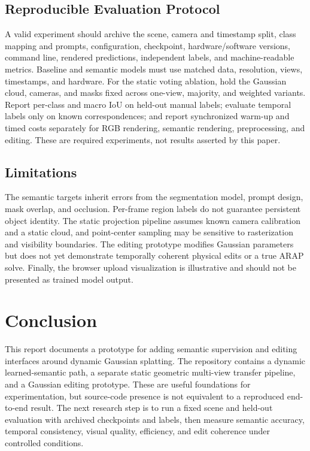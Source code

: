\documentclass[conference]{IEEEtran}
\begin{document}
\subsection{Reproducible Evaluation Protocol}
A valid experiment should archive the scene, camera and timestamp split, class mapping and prompts, configuration, checkpoint, hardware/software versions, command line, rendered predictions, independent labels, and machine-readable metrics. Baseline and semantic models must use matched data, resolution, views, timestamps, and hardware. For the static voting ablation, hold the Gaussian cloud, cameras, and masks fixed across one-view, majority, and weighted variants. Report per-class and macro IoU on held-out manual labels; evaluate temporal labels only on known correspondences; and report synchronized warm-up and timed costs separately for RGB rendering, semantic rendering, preprocessing, and editing. These are required experiments, not results asserted by this paper.

\subsection{Limitations}
The semantic targets inherit errors from the segmentation model, prompt design, mask overlap, and occlusion. Per-frame region labels do not guarantee persistent object identity. The static projection pipeline assumes known camera calibration and a static cloud, and point-center sampling may be sensitive to rasterization and visibility boundaries. The editing prototype modifies Gaussian parameters but does not yet demonstrate temporally coherent physical edits or a true ARAP solve. Finally, the browser upload visualization is illustrative and should not be presented as trained model output.

\section{Conclusion}
This report documents a prototype for adding semantic supervision and editing interfaces around dynamic Gaussian splatting. The repository contains a dynamic learned-semantic path, a separate static geometric multi-view transfer pipeline, and a Gaussian editing prototype. These are useful foundations for experimentation, but source-code presence is not equivalent to a reproduced end-to-end result. The next research step is to run a fixed scene and held-out evaluation with archived checkpoints and labels, then measure semantic accuracy, temporal consistency, visual quality, efficiency, and edit coherence under controlled conditions.



\end{document}
